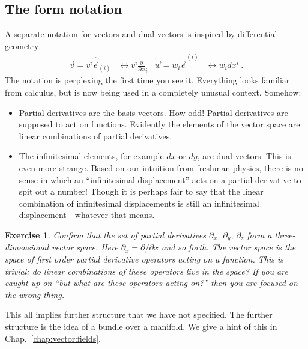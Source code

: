 \documentclass[
  11pt,
	colorful,
	raggedright,
]{tufte-style-thesis-flip}
\newtheorem{exercise}{Exercise}[section]
\begin{document}
\subsection{The form notation}

A separate notation for vectors and dual vectors is inspired by differential geometry: 
\begin{align}
  \vec{v}=v^i \hat{\vec{e}}_{(i)} &\leftrightarrow v^i \frac{\partial}{\partial x}_i
  &
  \tilde{\vec w}=w_i \tilde{\vec{e}}^{(i)} &\leftrightarrow w_i dx^i \ .
\end{align}
The notation is perplexing the first time you see it. Everything looks familiar from calculus, but is now being used in a completely unusual context. Somehow:
\begin{itemize}
   \item Partial derivatives are the basis vectors. How odd! Partial derivatives are supposed to act on functions. Evidently the elements of the vector space are linear combinations of partial derivatives. 
   \item The infinitesimal elements, for example $dx$ or $dy$, are dual vectors. This is even more strange. Based on our intuition from freshman physics, there is no sense in which an ``infinitesimal displacement'' acts on a partial derivative to spit out a number! Though it is perhaps fair to say that the linear combination of infinitesimal displacements is still an infinitesimal displacement---whatever that means.
 \end{itemize} 
 \begin{exercise}
 Confirm that the set of partial derivatives $\partial_x$, $\partial_y$, $\partial_z$ form a three-dimensional vector space. Here $\partial_x = \partial/\partial x$ and so forth. The vector space is the space of first order partial derivative operators acting on a function. This is trivial: do linear combinations of these operators live in the space? If you are caught up on ``but what are these operators acting on?'' then you are focused on the wrong thing.
 \end{exercise}
 This all implies further structure that we have not specified. The further structure is the idea of a bundle over a manifold. We give a hint of this in Chap.~\ref{chap:vector:fields}.
\end{document}
